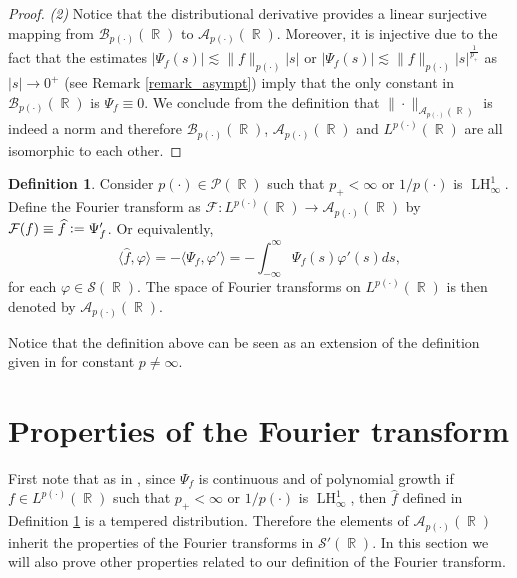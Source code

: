 \documentclass[11pt,reqno]{amsart}
\theoremstyle{definition}
\theoremstyle{definition}
\theoremstyle{definition}
\newtheorem{definition}[theorem]{Definition}
\DeclareMathOperator{\R}{\mathbb{R}}
\newcommand{\p}{p(\cdot)}
\newcommand{\Lp}{L^{\p}(\R)}
\newcommand{\defeq}{\vcentcolon=}
\newcommand{\LH}{\operatorname{LH}_\infty^1}
\begin{document}
\begin{proof}
{\it (2)} Notice that the distributional derivative provides a linear surjective mapping from $\mathcal{B}_{p(\cdot)}(\R)$ to $\mathcal{A}_{p(\cdot)}(\R)$. Moreover, it is injective due to the fact that the estimates $|\Psi_f(s)|\lesssim \|f\|_{\p}|s|$ or $|\Psi_f(s)|\lesssim \|f\|_{\p}|s|^{\frac{1}{p_{+}}}$ as $|s|\to0^+$ (see Remark \ref{remark_asympt}) imply that the only constant in $\mathcal{B}_{\p}(\R)$ is $\Psi_f\equiv0$. We conclude from the definition that $\|\cdot\|_{\mathcal{A}_{\p}(\R)}$ is indeed a norm and therefore $\mathcal{B}_{p(\cdot)}(\R)$, $\mathcal{A}_{p(\cdot)}(\R)$ and $\Lp$ are all isomorphic to each other.
\end{proof}


\begin{definition}\label{definition_Fourier}
    Consider $\p\in\mathcal{P}(\R)$ such that $p_{+}<\infty$ or $1/\p$ is $\LH$. Define the Fourier transform as $\mathcal{F}:\Lp\to \mathcal{A}_{\p}(\R)$ by $\mathcal{F}(f)\equiv\widehat{f}\defeq\Psi_f'$.
    Or equivalently,
    $$\langle \widehat{f},\varphi\rangle=-\langle \Psi_f,\varphi'\rangle=-\int_{-\infty}^{\infty}\Psi_f(s)\varphi'(s)ds,$$ for each $\varphi\in\mathcal{S}(\R)$. The space of Fourier transforms on $L^{\p}(\R)$ is then denoted by $\mathcal{A}_{\p}(\R)$. 
\end{definition}


Notice that the definition above can be seen as an extension of the definition given in \cite{Talvila2025} for constant $p\neq \infty$.

\section{Properties of the Fourier transform}\label{sec-prop-fourier}

First note that as in \cite{Talvila2025}, since $\Psi_f$ is continuous and of polynomial growth if $f\in \Lp$ such that $p_+<\infty$ or $1/\p$ is $\LH$, then $\widehat{f}$ defined in Definition \ref{definition_Fourier} is a tempered distribution. Therefore the elements of $\mathcal{A}_{\p}(\R)$ inherit the properties of the Fourier transforms in $\mathcal{S}'(\R)$. In this section we will also prove other properties related to our definition of the Fourier transform.
\end{document}

